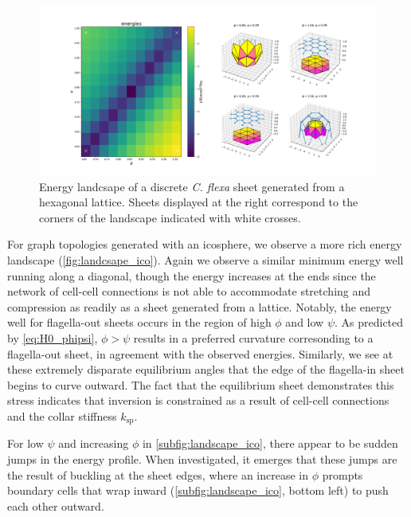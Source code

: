 \begin{figure}
	\centering
	\includegraphics[width=\textwidth]{landscape_flat.png}
	\caption[Energy landscape of a discrete \textit{C. flexa} sheet generated from a hexagonal lattice]{Energy landcsape of a discrete \textit{C. flexa} sheet generated from a hexagonal lattice. Sheets displayed at the right correspond to the corners of the landscape indicated with white crosses.}
	\label{fig:landscape_flat}
\end{figure}

For graph topologies generated with an icosphere, we observe a more rich energy landscape (\cref{fig:landcsape_ico}).
Again we observe a similar minimum energy well running along a diagonal, though the energy increases at the ends since the network of cell-cell connections is not able to accommodate stretching and compression as readily as a sheet generated from a lattice.
Notably, the energy well for flagella-out sheets occurs in the region of high $\phi$ and low $\psi$. 
As predicted by \cref{eq:H0_phipsi}, $\phi > \psi$ results in a preferred curvature corresonding to a flagella-out sheet, in agreement with the observed energies.
Similarly, we see at these extremely disparate equilibrium angles that the edge of the flagella-in sheet begins to curve outward.
The fact that the equilibrium sheet demonstrates this stress indicates that inversion is constrained as a result of cell-cell connections and the collar stiffness $k_{\text{sp}}$.

For low $\psi$ and increasing $\phi$ in \cref{subfig:landscape_ico}, there appear to be sudden jumps in the energy profile. 
When investigated, it emerges that these jumps are the result of buckling at the sheet edges, where an increase in $\phi$ prompts boundary cells that wrap inward (\cref{subfig:landscape_ico}, bottom left) to push each other outward.


